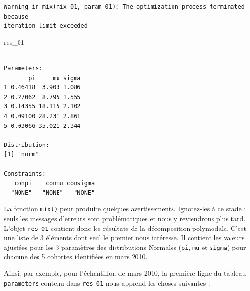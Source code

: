 \documentclass[
  a4paper,
  DIV=11,
  numbers=noendperiod,
  oneside]{scrreprt}
\newenvironment{Shaded}{}{}
\newcommand{\NormalTok}[1]{\textcolor[rgb]{0.14,0.16,0.18}{#1}}
\newcommand{\SpecialCharTok}[1]{\textcolor[rgb]{0.00,0.36,0.77}{#1}}
\begin{document}
\begin{verbatim}
Warning in mix(mix_01, param_01): The optimization process terminated because
iteration limit exceeded
\end{verbatim}

\begin{Shaded}
\begin{Highlighting}[]
\NormalTok{res\_01}
\end{Highlighting}
\end{Shaded}

\begin{verbatim}

Parameters:
       pi     mu sigma
1 0.46418  3.903 1.086
2 0.27062  8.795 1.555
3 0.14355 18.115 2.102
4 0.09100 28.231 2.861
5 0.03066 35.021 2.344

Distribution:
[1] "norm"

Constraints:
   conpi    conmu consigma 
  "NONE"   "NONE"   "NONE" 
\end{verbatim}


La fonction \texttt{mix()} peut produire quelques avertissements.
Ignorez-les à ce stade : seuls les messages d'erreurs sont
problématiques et nous y reviendrons plus tard. L'objet \texttt{res\_01}
contient donc les résultats de la décomposition polymodale. C'est une
liste de 3 éléments dont seul le premier nous intéresse. Il contient les valeurs ajustées pour les 3
paramètres des distributions Normales (\texttt{pi}, \texttt{mu} et
\texttt{sigma}) pour chacune des 5 cohortes identifiées en mars 2010.

Ainsi, par exemple, pour l'échantillon de mars 2010, la première ligne
du tableau \texttt{parameters} contenu dans \texttt{res\_01} nous
apprend les choses suivantes :

\begin{Shaded}
\end{Shaded}
\end{document}
